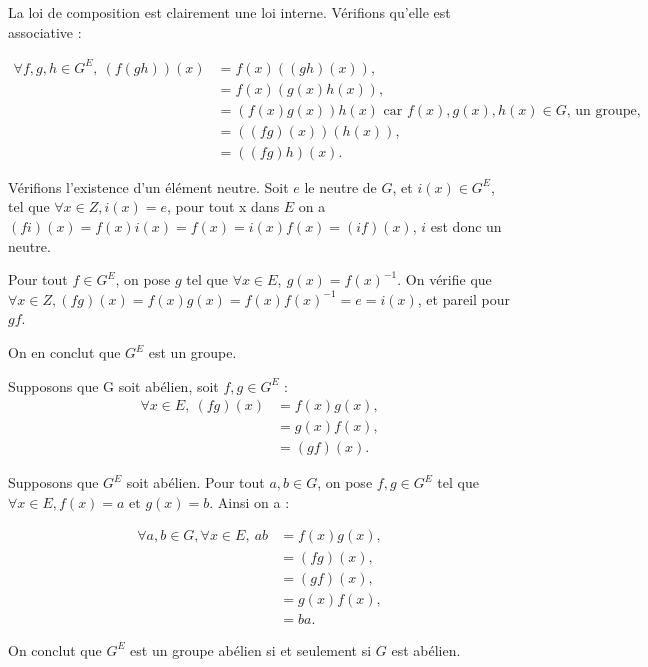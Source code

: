 La loi de composition est clairement une loi interne. Vérifions qu'elle est associative :

\begin{align*}
    \forall f,g,h \in G^E,\ (f(gh))(x) &= f(x) ((gh)(x)), \\
    &= f(x) (g(x)h(x)), \\
    &= (f(x) g(x)) h(x) \text{ car } f(x),g(x),h(x) \in G \text{, un groupe,} \\
    &= ((fg) (x))(h(x)), \\
    &= ((fg)h)(x).
\end{align*}

Vérifions l'existence d'un élément neutre. Soit $e$ le neutre de $G$, et $i(x) \in G^E$, tel que $\forall x \in Z, i(x) = e$, pour tout x dans $E$ on a $(fi)(x) = f(x)i(x) = f(x) = i(x)f(x) = (if)(x)$, $i$ est donc un neutre.


Pour tout $f \in G^E$, on pose $g$ tel que $\forall x\in E,\ g(x) = f(x)^{-1}$. On vérifie que $\forall x\in Z, (fg)(x) = f(x)g(x) = f(x)f(x)^{-1} = e = i(x)$, et pareil pour $gf$.

On en conclut que $G^E$ est un groupe.
\medskip

Supposons que G soit abélien, soit $f,g \in G^E$ :
\begin{align*}
    \forall x\in E,\ (fg)(x) &= f(x)g(x), \\
    &= g(x)f(x), \\
    &= (gf)(x). 
\end{align*}

Supposons que $G^E$ soit abélien. Pour tout $a,b \in G$, on pose $f,g\in G^E$ tel que $\forall x\in E, f(x)=a \text{ et } g(x) = b$. Ainsi on a :

\begin{align*}
    \forall a,b \in G, \forall x\in E, \ ab &= f(x)g(x), \\
    &= (fg)(x), \\
    &= (gf)(x), \\
    &=  g(x)f(x), \\
    &= ba.
\end{align*}

On conclut que $G^E$ est un groupe abélien si et seulement si $G$ est abélien.
